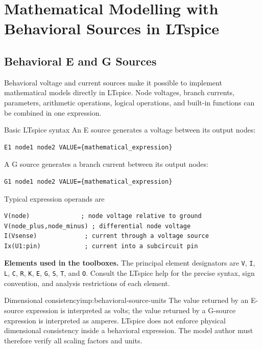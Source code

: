 \chapter[Behavioral Sources in LTspice]
{Mathematical Modelling with Behavioral Sources in LTspice}
\label{app:behavioral-sources}

\section{Behavioral E and G Sources}
\label{sec:behavioral-eg-sources}

Behavioral voltage and current sources make it possible to implement
mathematical models directly in LTspice. Node voltages, branch currents,
parameters, arithmetic operations, logical operations, and built-in functions
can be combined in one expression.

\begin{formulaBox}{Basic LTspice syntax}
An E source generates a voltage between its output nodes:
\begin{lstlisting}[style=LTspice]
E1 node1 node2 VALUE={mathematical_expression}
\end{lstlisting}

A G source generates a branch current between its output nodes:
\begin{lstlisting}[style=LTspice]
G1 node1 node2 VALUE={mathematical_expression}
\end{lstlisting}

Typical expression operands are
\begin{lstlisting}[style=LTspice]
V(node)              ; node voltage relative to ground
V(node_plus,node_minus) ; differential node voltage
I(Vsense)             ; current through a voltage source
Ix(U1:pin)            ; current into a subcircuit pin
\end{lstlisting}
\end{formulaBox}

\begin{noteBox}
\textbf{Elements used in the toolboxes.}
The principal element designators are
\texttt{V}, \texttt{I}, \texttt{L}, \texttt{C}, \texttt{R}, \texttt{K},
\texttt{E}, \texttt{G}, \texttt{S}, \texttt{T}, and \texttt{O}.
Consult the LTspice help for the precise syntax, sign convention, and analysis
restrictions of each element.
\end{noteBox}

\begin{important}{Dimensional consistency}{imp:behavioral-source-units}
The value returned by an E-source expression is interpreted as volts; the
value returned by a G-source expression is interpreted as amperes. LTspice
does not enforce physical dimensional consistency inside a behavioral
expression. The model author must therefore verify all scaling factors and
units.
\end{important}


